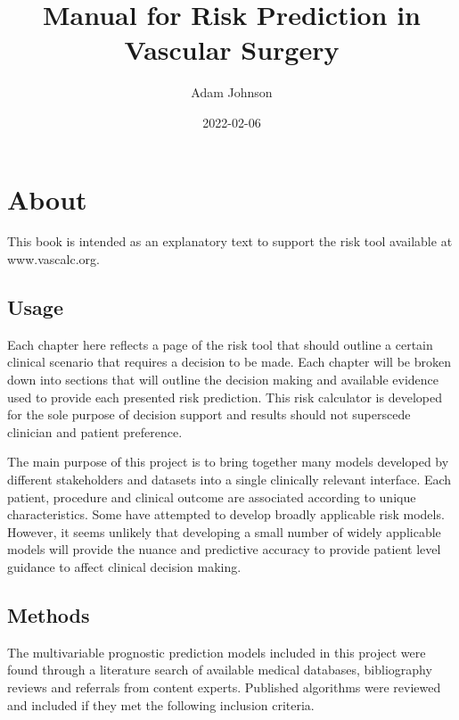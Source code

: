 \documentclass[
]{book}
\title{Manual for Risk Prediction in Vascular Surgery}
\author{Adam Johnson}
\date{2022-02-06}
\begin{document}
\maketitle

{
\setcounter{tocdepth}{1}
\tableofcontents
}
\hypertarget{about}{%
\chapter{About}\label{about}}

This book is intended as an explanatory text to support the risk tool available at www.vascalc.org.

\hypertarget{usage}{%
\section{Usage}\label{usage}}

Each chapter here reflects a page of the risk tool that should outline a certain clinical scenario that requires a decision to be made. Each chapter will be broken down into sections that will outline the decision making and available evidence used to provide each presented risk prediction. This risk calculator is developed for the sole purpose of decision support and results should not superscede clinician and patient preference.

The main purpose of this project is to bring together many models developed by different stakeholders and datasets into a single clinically relevant interface. Each patient, procedure and clinical outcome are associated according to unique characteristics. Some have attempted to develop broadly applicable risk models.\citep{meguidSurgicalRiskPreoperative2016c, meguidSurgicalRiskPreoperative2016d, meguidSurgicalRiskPreoperative2016e} However, it seems unlikely that developing a small number of widely applicable models will provide the nuance and predictive accuracy to provide patient level guidance to affect clinical decision making.

\hypertarget{methods}{%
\section{Methods}\label{methods}}

The multivariable prognostic prediction models included in this project were found through a literature search of available medical databases, bibliography reviews and referrals from content experts. Published algorithms were reviewed and included if they met the following inclusion criteria.
\end{document}

